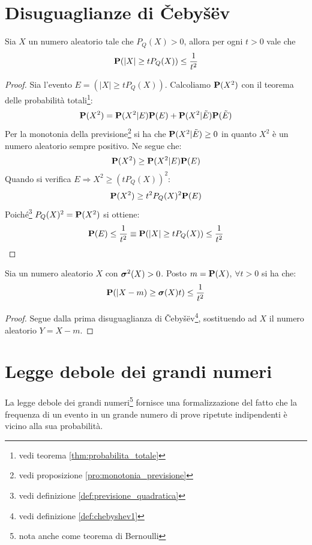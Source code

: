 \section{Disuguaglianze di Čebyšëv} %
\begin{definition}\label{def:chebyshev1}
  Sia $X$ un numero aleatorio tale che \( P_Q(X) > 0 \), allora per ogni \( t > 0 \) vale che
  \[ \mathbf{P}(|X| \ge t P_Q(X)) \le \frac{1}{t^2} \]
\end{definition}

\begin{proof}
  Sia l'evento \( E = (|X| \ge t P_Q(X)) \). Calcoliamo \( \mathbf{P}(X^2) \) con il teorema delle probabilità totali\footnote{vedi teorema \ref{thm:probabilita_totale}}:
  \[ \mathbf{P}(X^2) = \mathbf{P}(X^2|E)\mathbf{P}(E) + \mathbf{P}(X^2|\tilde{E})\mathbf{P}(\tilde{E}) \] %
  Per la monotonia della previsione\footnote{vedi proposizione \ref{pro:monotonia_previsione}} si ha che \( \mathbf{P}(X^2|\tilde{E}) \ge 0 \) in quanto \( X^2 \) è un numero aleatorio sempre positivo.
  Ne segue che:
  \[ \mathbf{P}(X^2) \ge \mathbf{P}(X^2|E)\mathbf{P}(E) \]
  Quando si verifica  \( E \Rightarrow X^2 \ge (t P_Q(X))^2 \):
  \[ \mathbf{P}(X^2) \ge t^2 P_Q(X)^2 \mathbf{P}(E) \]
  Poiché\footnote{vedi definizione \ref{def:previsione_quadratica}} \( P_Q(X)^2 = \mathbf{P}(X^2) \) si ottiene:
  \[ \mathbf{P}(E) \le \frac{1}{t^2} \equiv \mathbf{P}(|X| \ge t P_Q(X)) \le \frac{1}{t^2} \]
\end{proof}

\begin{definition}\label{def:chebyshev2}
  Sia un numero aleatorio $X$ con \( \boldsymbol\sigma^2(X) > 0 \). Posto \( m = \mathbf{P}(X) \), \( \forall t > 0 \) si ha che:
  \[
  \mathbf{P}(|X - m) \ge \boldsymbol\sigma(X)t) \le \frac{1}{t^2}
  \]
\end{definition}

\begin{proof}
  Segue dalla prima disuguaglianza di Čebyšëv\footnote{vedi definizione \ref{def:chebyshev1}}, sostituendo ad $X$ il numero aleatorio \( Y = X - m \).
\end{proof}

\section{Legge debole dei grandi numeri}
La legge debole dei grandi numeri\footnote{nota anche come teorema di Bernoulli} fornisce una formalizzazione del fatto che la frequenza di un evento in un grande numero di prove ripetute indipendenti è vicino alla sua probabilità.

